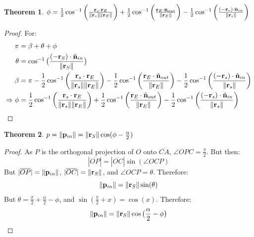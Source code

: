 \documentclass[oneside]{book}
\theoremstyle{mystyle}
\newtheorem{theorem}{Theorem}[section]
\DeclarePairedDelimiter\norm{\lVert}{\rVert}
\begin{document}
\begin{theorem}
$\phi = \frac{1}{2}\cos^{-1}\bigg(\frac{\mathbf{r}_{s}\cdot \mathbf{r}_{E}}{\norm{\mathbf{r}_{s}}\norm{\mathbf{r}_{E}}}\bigg) + \frac{1}{2}\cos^{-1}\bigg(\frac{\mathbf{r}_{E}\cdot \hat{\mathbf{n}}_{out}}{\norm{\mathbf{r}_{E}}}\bigg) - \frac{1}{2}\cos^{-1}\bigg(\frac{(-\mathbf{r}_{s})\cdot \hat{\mathbf{n}}_{in}}{\norm{\mathbf{r}_{s}}}\bigg) $
\end{theorem}
\begin{proof}
For:
\begin{align*}
    \pi &=\beta+\theta+\phi\\
    \theta &= \cos^{-1}\big(\frac{(-\mathbf{r}_{S})\cdot\hat{\mathbf{n}}_{in}}{\norm{\mathbf{r}_{S}}}\big)\\
    \beta &= \pi-\frac{1}{2}\cos^{-1}\bigg(\frac{\mathbf{r}_{s}\cdot \mathbf{r}_{E}}{\norm{\mathbf{r}_{s}}\norm{\mathbf{r}_{E}}}\bigg) - \frac{1}{2}\cos^{-1}\bigg(\frac{\mathbf{r}_{E}\cdot \hat{\mathbf{n}}_{out}}{\norm{\mathbf{r}_{E}}}\bigg) - \frac{1}{2}\cos^{-1}\bigg(\frac{(-\mathbf{r}_{s})\cdot \hat{\mathbf{n}}_{in}}{\norm{\mathbf{r}_{s}}}\bigg)\\
    \Rightarrow \phi & = \frac{1}{2}\cos^{-1}\bigg(\frac{\mathbf{r}_{s}\cdot \mathbf{r}_{E}}{\norm{\mathbf{r}_{s}}\norm{\mathbf{r}_{E}}}\bigg) + \frac{1}{2}\cos^{-1}\bigg(\frac{\mathbf{r}_{E}\cdot \hat{\mathbf{n}}_{out}}{\norm{\mathbf{r}_{E}}}\bigg) - \frac{1}{2}\cos^{-1}\bigg(\frac{(-\mathbf{r}_{s})\cdot \hat{\mathbf{n}}_{in}}{\norm{\mathbf{r}_{s}}}\bigg)
\end{align*}
\end{proof}
\begin{theorem}
\label{theorem:impact_parameter_p_closed_form_solution}
$p = \norm{\mathbf{p}_{in}} = \norm{\mathbf{r}_{S}}\cos(\phi - \frac{\alpha}{2})$
\end{theorem}
\begin{proof}
As $P$ is the orthogonal projection of $O$ onto $\overline{CA}$, $\angle OPC = \frac{\pi}{2}$. But then:
\begin{equation*}
    |\overline{OP}| = |\overline{OC}|\sin(\angle OCP)
\end{equation*}
But $|\overline{OP}| = \norm{\mathbf{p}_{in}}$, $|\overline{OC}| = \norm{\mathbf{r}_{S}}$, and $\angle OCP = \theta$. Therefore:
\begin{equation*}
    \norm{\mathbf{p}_{in}} = \norm{\mathbf{r}_{S}}\sin(\theta)
\end{equation*}
But $\theta = \frac{\pi}{2} + \frac{\alpha}{2} - \phi$, and $\sin(\frac{\pi}{2}+x) = \cos(x)$. Therefore:
\begin{equation*}
    \norm{\mathbf{p}_{in}} = \norm{\mathbf{r}_{S}}\cos\big(\frac{\alpha}{2} - \phi\big)
\end{equation*}
\end{proof}
\end{document}
